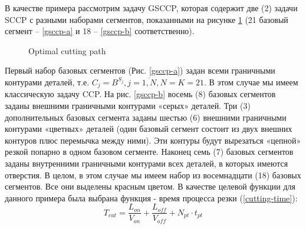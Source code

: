 \documentclass{article}
\begin{document}
В качестве примера рассмотрим задачу GSCCP,
которая содержит две (2)
задачи SCCP с разными наборами сегментов,
показанными на рисунке \ref{gsccp-both}
(21 базовый сегмент – \ref{gsccp-a}
и 18 – \ref{gsccp-b} соответственно).

\begin{figure}
  \centering
  \caption{Optimal cutting path }
  \label{gsccp-both}
\end{figure}

Первый набор базовых сегментов (Рис. \ref{gsccp-a})
задан всеми граничными контурами деталей, т.е.
$C_j = B^{S_j}, j=\overline{1,N}, N=K=21$.
В этом случае мы имеем классическую задачу CCP.
На рис. \ref{gsccp-b} восемь (8)
базовых сегментов заданы внешними граничными контурами «серых» деталей.
Три (3) дополнительных базовых сегмента заданы шестью (6)
внешними граничными контурами «цветных» деталей
(один базовый сегмент состоит из двух внешних контуров плюс перемычка между ними).
Эти контуры будут вырезаться «цепной» резкой попарно в одном базовом сегменте.
Наконец семь (7) базовых сегментов заданы внутренними
граничными контурами всех деталей,
в которых имеются отверстия.
В целом, в этом случае мы имеем набор из восемнадцати (18)
базовых сегментов.
Все они выделены красным цветом.
В качестве целевой функции для данного примера была выбрана функция - время процесса резки (\ref{cutting-time}):
$$
T_{cut} = \frac{L_{on}}{V_{on}} + \frac{L_{off}}{V_{off}} +N_{pt} \cdot t_{pt}
$$
\end{document}
